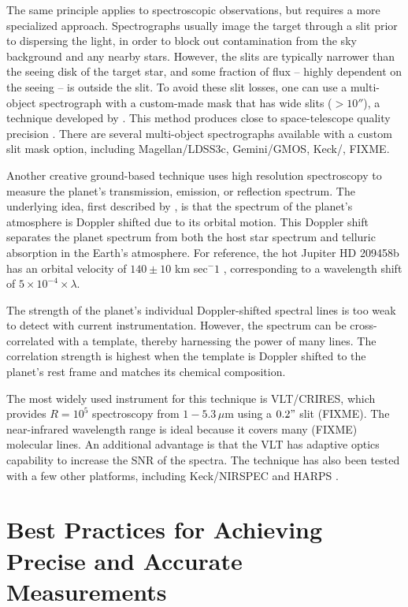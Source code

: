 \documentclass[graybox,natbib,nosecnum]{svmult}
\begin{document}
The same principle applies to spectroscopic observations, but requires a more specialized approach.  Spectrographs usually image the target through a slit prior to dispersing the light, in order to block out contamination from the sky background and any nearby stars. However, the slits are typically narrower than the seeing disk of the target star, and some fraction of flux -- highly dependent on the seeing -- is outside the slit.  To avoid these slit losses, one can use a multi-object spectrograph with a custom-made mask that has wide slits ($>10''$), a technique developed by \cite{bean10}. This method produces close to space-telescope quality precision \citep[e.g.][]{}.  There are several multi-object spectrographs available with a custom slit mask option, including Magellan/LDSS3c, Gemini/GMOS, Keck/, FIXME.  

Another creative ground-based technique uses high resolution spectroscopy to measure the planet's transmission, emission, or reflection spectrum.  The underlying idea, first described by \citep{FIXME}, is that the spectrum of the planet's atmosphere is Doppler shifted due to its orbital motion. This Doppler shift separates the planet spectrum from both the host star spectrum and telluric absorption in the Earth's atmosphere. For reference, the hot Jupiter HD 209458b has an orbital velocity of $140\pm10$ km sec$^-1$ \citep{snellen10}, corresponding to a wavelength shift of $5\times10^{-4}\times \lambda$.  

The strength of the planet's individual Doppler-shifted spectral lines is too weak to detect with current instrumentation. However, the spectrum can be cross-correlated with a template, thereby harnessing the power of many lines.  The correlation strength is highest when the template is Doppler shifted to the planet's rest frame and matches its chemical composition.

The most widely used instrument for this technique is VLT/CRIRES, which provides $R=10^5$ spectroscopy from $1-5.3\,\mu$m using a $0.2"$ slit (FIXME).  The near-infrared wavelength range is ideal because it covers many (FIXME) molecular lines. An additional advantage is that the VLT has adaptive optics capability to increase the SNR of the spectra.  The technique has also been tested with a few other platforms, including Keck/NIRSPEC and HARPS \citep{lockwood14, martins15}. 

\section{Best Practices for Achieving Precise and Accurate Measurements}
\end{document}
